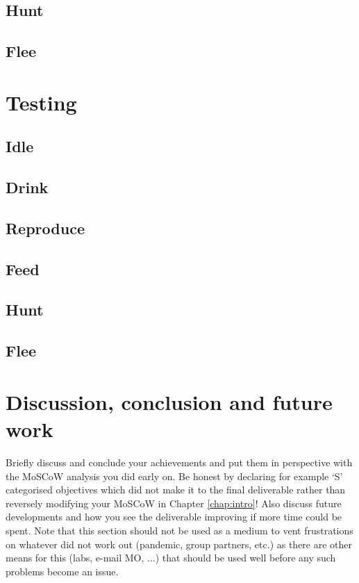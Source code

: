 \documentclass[a4paper, oneside, 11pt]{report}
\begin{document}
\section{Hunt}

\section{Flee}


\chapter{Testing}

\section{Idle}

\section{Drink}

\section{Reproduce}

\section{Feed}

\section{Hunt}

\section{Flee}

\chapter{Discussion, conclusion and future work}

Briefly discuss and conclude your achievements and put them in perspective with the MoSCoW analysis you did early on. Be honest by declaring for example `S' categorised objectives which did not make it to the final deliverable rather than reversely modifying your MoSCoW in Chapter \ref{chap:intro}! Also discuss future developments and how you see the deliverable improving if more time could be spent. Note that this section should not be used as a medium to vent frustrations on whatever did not work out (pandemic, group partners, etc.) as there are other means for this (labs, e-mail MO, ...) that should be used well before any such problems become an issue.
\end{document}
